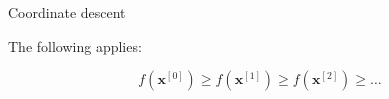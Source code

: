 \documentclass[11pt,compress,t,notes=noshow, xcolor=table]{beamer}
\begin{document}
\begin{vbframe}{Coordinate descent}
\begin{itemize}
\lz

The following applies:

$$
  f(\bm{x}^{[0]}) \geq f(\bm{x}^{[1]}) \geq f(\bm{x}^{[2]}) \geq \hdots
$$
\end{itemize}





%
%



\end{vbframe}
\end{document}
